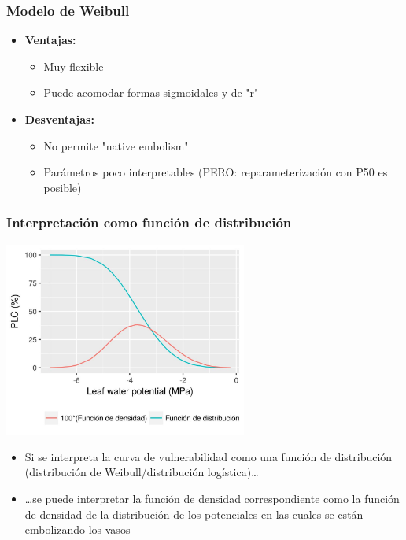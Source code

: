 \documentclass[usepdftitle=false]{beamer}
\newcommand{\Blue}[1]{{\color{blue!50!black}\textbf{#1}}}
\newcommand{\tw}{\textwidth}
\begin{document}
\begin{frame}
\frametitle{Modelo de Weibull}
		\begin{itemize}
				\item<1-> \Blue{Ventajas:}
			\begin{itemize}
				\item Muy flexible
				\item Puede acomodar formas sigmoidales y de "{}r"
			\end{itemize}
			\item<2> \Blue{Desventajas:}	
			\begin{itemize}
				\item No permite "native embolism"
				\item Parámetros poco interpretables (PERO: reparameterización con P50 es posible)
			\end{itemize}
		\end{itemize}	
	\end{frame}	


\begin{frame}
\frametitle{Interpretación como función de distribución}
\centering
\includegraphics[width = 0.6\tw]{pictures/weib_pdf.jpg}
\begin{itemize}
   \item<only@1> Si se interpreta la curva de vulnerabilidad como una función de distribución (distribución de Weibull/distribución logística)\dots
   \item<only@2>\dots se puede interpretar la función de densidad correspondiente como la función de densidad de la distribución de los potenciales en las cuales se están embolizando los vasos
\end{itemize}
\end{frame}	
	
\end{document}
